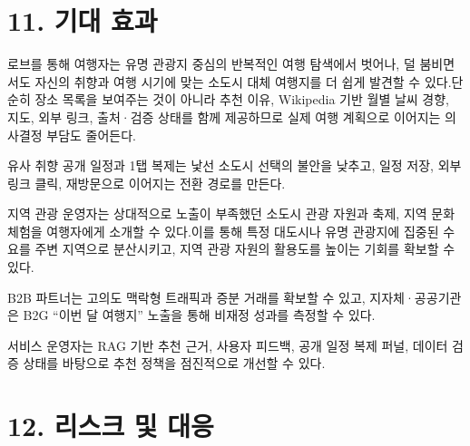 \documentclass[12pt,a4paper]{article}
\newcommand{\DocNeedspace}[1]{\par\ifdim\dimexpr\pagegoal-\pagetotal\relax<#1\newpage\fi}
\newcommand{\TocNoChildTight}{\vspace{-0.28em}}
\begin{document}
\DocNeedspace{10\baselineskip}
\section*{11. 기대 효과}
\addtocontents{toc}{\protect\TocNoChildTight}


\DocNeedspace{3\baselineskip}
로브를 통해 여행자는 유명 관광지 중심의 반복적인 여행 탐색에서 벗어나, 덜 붐비면서도 자신의 취향과 여행 시기에 맞는 소도시 대체 여행지를 더 쉽게 발견할 수 있다.\newline 단순히 장소 목록을 보여주는 것이 아니라 추천 이유, Wikipedia 기반 월별 날씨 경향, 지도, 외부 링크, 출처·검증 상태를 함께 제공하므로 실제 여행 계획으로 이어지는 의사결정 부담도 줄어든다.


\DocNeedspace{3\baselineskip}
유사 취향 공개 일정과 1탭 복제는 낯선 소도시 선택의 불안을 낮추고, 일정 저장, 외부 링크 클릭, 재방문으로 이어지는 전환 경로를 만든다.


\DocNeedspace{3\baselineskip}
지역 관광 운영자는 상대적으로 노출이 부족했던 소도시 관광 자원과 축제, 지역 문화 체험을 여행자에게 소개할 수 있다.\newline 이를 통해 특정 대도시나 유명 관광지에 집중된 수요를 주변 지역으로 분산시키고, 지역 관광 자원의 활용도를 높이는 기회를 확보할 수 있다.


\DocNeedspace{3\baselineskip}
B2B 파트너는 고의도 맥락형 트래픽과 증분 거래를 확보할 수 있고, 지자체·공공기관은 B2G “이번 달 여행지” 노출을 통해 비재정 성과를 측정할 수 있다.


\DocNeedspace{3\baselineskip}
서비스 운영자는 RAG 기반 추천 근거, 사용자 피드백, 공개 일정 복제 퍼널, 데이터 검증 상태를 바탕으로 추천 정책을 점진적으로 개선할 수 있다.


\newpage

\DocNeedspace{10\baselineskip}
\section*{12. 리스크 및 대응}
\addtocontents{toc}{\protect\TocNoChildTight}
\end{document}
